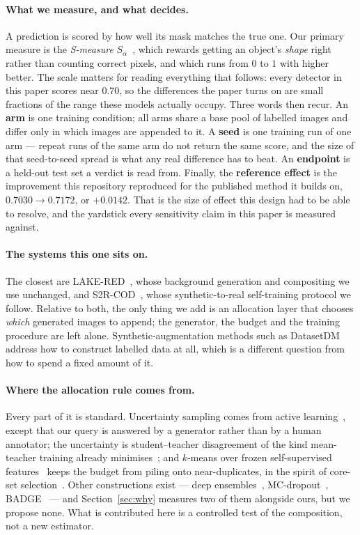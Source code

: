 \documentclass{article} %
\begin{document}
\paragraph{What we measure, and what decides.} A prediction is scored by how well its mask matches
the true one. Our primary measure is the \emph{S-measure} $S_\alpha$~\citep{fan2017structure}, which
rewards getting an object's \emph{shape} right rather than counting correct pixels, and which runs
from $0$ to $1$ with higher better. The scale matters for reading everything that follows: every
detector in this paper scores near $0.70$, so the differences the paper turns on are small fractions
of the range these models actually occupy. Three words then recur. An \textbf{arm} is one training
condition; all arms share a base pool of labelled images and differ only in which images are
appended to it. A \textbf{seed} is one training run of one arm --- repeat runs of the same arm do
not return the same score, and the size of that seed-to-seed spread is what any real difference has
to beat. An \textbf{endpoint} is a held-out test set a verdict is read from. Finally, the
\textbf{reference effect} is the improvement this repository reproduced for the published method it
builds on, $0.7030 \rightarrow 0.7172$, or $+0.0142$. That is the size of effect this design had to
be able to resolve, and the yardstick every sensitivity claim in this paper is measured against.

\paragraph{The systems this one sits on.} The closest are
LAKE-RED~\citep{zhao2024lakered}, whose background generation and compositing we use unchanged, and
S2R-COD~\citep{luo2025s2rcod}, whose synthetic-to-real self-training protocol we follow. Relative to
both, the only thing we add is an allocation layer that chooses \emph{which} generated images to
append; the generator, the budget and the training procedure are left alone. Synthetic-augmentation
methods such as DatasetDM~\citep{wu2023datasetdm} address how to construct labelled data at all,
which is a different question from how to spend a fixed amount of it.

\paragraph{Where the allocation rule comes from.} Every part of it is standard. Uncertainty sampling
comes from active learning~\citep{settles2009active}, except that our query is answered by a
generator rather than by a human annotator; the uncertainty is student--teacher disagreement of the
kind mean-teacher training already minimises~\citep{tarvainen2017mean}; and $k$-means over frozen
self-supervised features~\citep{oquab2024dinov2,radford2021learning} keeps the budget from piling
onto near-duplicates, in the spirit of core-set selection~\citep{sener2018active}. Other
constructions exist --- deep ensembles~\citep{lakshminarayanan2017simple},
MC-dropout~\citep{gal2016dropout}, BADGE~\citep{ash2020deep} --- and Section~\ref{sec:why} measures
two of them alongside ours, but we propose none. What is contributed here is a controlled test of
the composition, not a new estimator.
\end{document}
